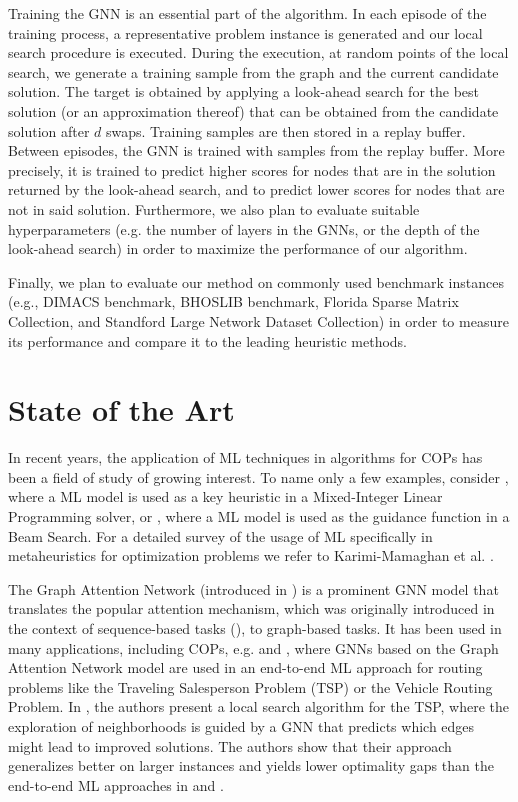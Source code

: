 \documentclass [11pt]{article}
\begin{document}
Training the GNN is an essential part of the algorithm. In each episode of the training process, a representative problem instance is generated and our local search procedure is executed. During the execution, at random points of the local search, we generate a training sample from the graph and the current candidate solution. The target is obtained by applying a look-ahead search for the best solution (or an approximation thereof) that can be obtained from the candidate solution after $d$ swaps. Training samples are then stored in a replay buffer. Between episodes, the GNN is trained with samples from the replay buffer. More precisely, it is trained to predict higher scores for nodes that are in the solution returned by the look-ahead search, and to predict lower scores for nodes that are not in said solution. Furthermore, we also plan to evaluate suitable hyperparameters (e.g. the number of layers in the GNNs, or the depth of the look-ahead search) in order to maximize the performance of our algorithm. 

Finally, we plan to evaluate our method on commonly used benchmark instances (e.g., DIMACS benchmark, BHOSLIB benchmark, Florida Sparse Matrix Collection, and Standford Large Network Dataset Collection) in order to measure its performance and compare it to the leading heuristic methods. 

\section{State of the Art}

In recent years, the application of ML techniques in algorithms for COPs has been a field of study of growing interest. To name only a few examples, consider \cite{Zarpellon2021}, where a ML model is used as a key heuristic in a Mixed-Integer Linear Programming solver, or \cite{Huber2021}, where a ML model is used as the guidance function in a Beam Search. For a detailed survey of the usage of ML specifically in metaheuristics for optimization problems we refer to Karimi-Mamaghan et al. \cite{KARIMIMAMAGHAN2022393}. 

 The Graph Attention Network (introduced in \cite{Velickovic2018}) is a prominent GNN model that translates the popular attention mechanism, which was originally introduced in the context of sequence-based tasks (\cite{Bahdanau2015}), to graph-based tasks. It has been used in many applications, including COPs, e.g. \cite{Kool2019} and \cite{Joshi2021}, where GNNs based on the Graph Attention Network model are used in an end-to-end ML approach for routing problems like the Traveling Salesperson Problem (TSP) or the Vehicle Routing Problem. In \cite{Hudson2021}, the authors present a local search algorithm for the TSP, where the exploration of neighborhoods is guided by a GNN that predicts which edges might lead to improved solutions. The authors show that their approach generalizes better on larger instances and yields lower optimality gaps than the end-to-end ML approaches in \cite{Kool2019} and \cite{Joshi2021}.  
\end{document}
